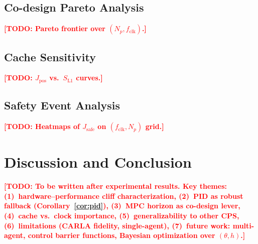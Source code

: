 \documentclass[conference]{IEEEtran}
\newcommand{\TODO}[1]{\textcolor{red}{\textbf{[TODO: #1]}}}
\begin{document}
\subsection{Co-design Pareto Analysis}
\TODO{Pareto frontier over $(N_p, f_\text{clk})$.}

\subsection{Cache Sensitivity}
\TODO{$J_\text{pos}$ vs.\ $S_\text{L1}$ curves.}

\subsection{Safety Event Analysis}
\TODO{Heatmaps of $J_\text{safe}$ on $(f_\text{clk}, N_p)$ grid.}

\section{Discussion and Conclusion}\label{sec:conclusion}

\TODO{To be written after experimental results.  Key themes:
  (1)~hardware--performance cliff characterization,
  (2)~PID as robust fallback (Corollary~\ref{cor:pid}),
  (3)~MPC horizon as co-design lever,
  (4)~cache vs.\ clock importance,
  (5)~generalizability to other CPS,
  (6)~limitations (CARLA fidelity, single-agent),
  (7)~future work: multi-agent, control barrier functions,
  Bayesian optimization over $(\theta, h)$.}



\end{document}
